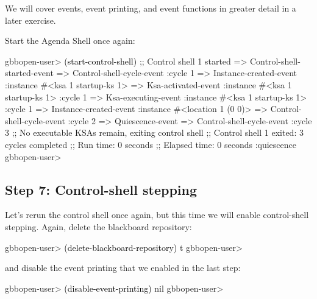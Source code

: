 \documentclass[10pt,twoside,english,pdftex]{article}
\begin{document}
We will cover events, event printing, and event functions in greater
detail in a later exercise.

%
%
Start the Agenda Shell once again:
%
\W\supp
\begin{example}
\textcolor{darkergray}{%
  gbbopen-user> \textcolor{black}{(start-control-shell)}
  ;; Control shell 1 started
  => Control-shell-started-event
  => Control-shell-cycle-event
       :cycle 1
  => Instance-created-event
       :instance #<ksa 1 startup-ks 1>
  => Ksa-activated-event
       :instance #<ksa 1 startup-ks 1>
       :cycle 1
  => Ksa-executing-event
       :instance #<ksa 1 startup-ks 1>
       :cycle 1
  => Instance-created-event
       :instance #<location 1 (0 0)>
  => Control-shell-cycle-event
       :cycle 2
  => Quiescence-event
  => Control-shell-cycle-event
       :cycle 3
  ;; No executable KSAs remain, exiting control shell
  ;; Control shell 1 exited: 3 cycles completed
  ;; Run time: 0 seconds
  ;; Elapsed time: 0 seconds
  :quiescence
  gbbopen-user>}
\end{example}

\subsection*{Step 7: Control-shell stepping}

%
%
Let's rerun the control shell once again, but this time we will enable
control-shell stepping. Again, delete the blackboard repository:
%
\W\supp
\begin{example}
\textcolor{darkergray}{%
  gbbopen-user> \textcolor{black}{(delete-blackboard-repository)}
  t
  gbbopen-user>}
\end{example}
%
and disable the event printing that we enabled in the last step:
%
\W\supp\notpretop
\begin{example}
\textcolor{darkergray}{%
  gbbopen-user> \textcolor{black}{(disable-event-printing)}
  nil
  gbbopen-user>}
\end{example}
\end{document}
